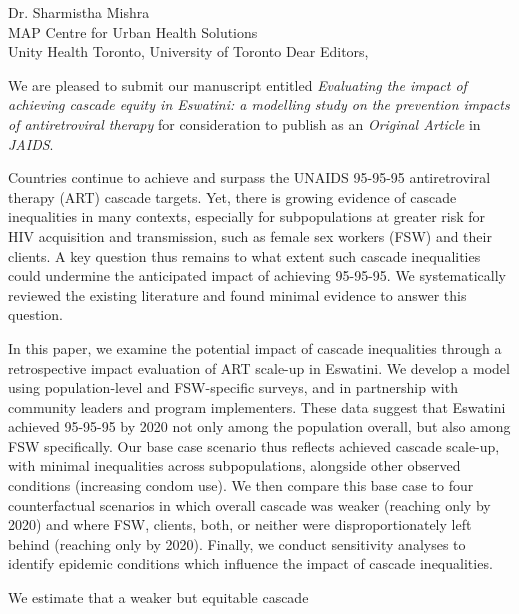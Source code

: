 \address{
  Dr. William A. Blattner\\
  Editor-in-Chief\\
  Journal of Acquired Immune Deficiency Syndromes
}{Dr. Sharmistha Mishra\\
  MAP Centre for Urban Health Solutions\\
  Unity Health Toronto, University of Toronto}
Dear Editors,
\par
We are pleased to submit our manuscript entitled
\emph{Evaluating the impact of achieving cascade equity in Eswatini:
  a modelling study on the prevention impacts of antiretroviral therapy}
for consideration to publish as an \emph{Original Article} in \emph{JAIDS}.
\par
Countries continue to achieve and surpass
the UNAIDS 95-95-95 antiretroviral therapy (ART) cascade targets.
Yet, there is growing evidence of cascade inequalities in many contexts,
especially for subpopulations at greater risk for HIV acquisition and transmission,
such as female sex workers (FSW) and their clients.
A key question thus remains to what extent
such cascade inequalities could undermine the anticipated impact of achieving 95-95-95.
We systematically reviewed the existing literature
and found minimal evidence to answer this question.
\par
In this paper, we examine the potential impact of cascade inequalities
through a retrospective impact evaluation of ART scale-up in Eswatini.
We develop a model using population-level and FSW-specific surveys,
and in partnership with community leaders and program implementers.
These data suggest that Eswatini achieved 95-95-95 by 2020
not only among the population overall, but also among FSW specifically.
Our base case scenario thus reflects achieved cascade scale-up,
with minimal inequalities across subpopulations,
alongside other observed conditions (\eg increasing condom use).
We then compare this base case to four counterfactual scenarios in which
overall cascade was weaker (reaching only \casmd by 2020) and where
FSW, clients, both, or neither were disproportionately left behind
(reaching only \caslo by 2020).
Finally, we conduct sensitivity analyses to identify epidemic conditions
which influence the impact of cascade inequalities.
\par
We estimate that a weaker but equitable cascade
